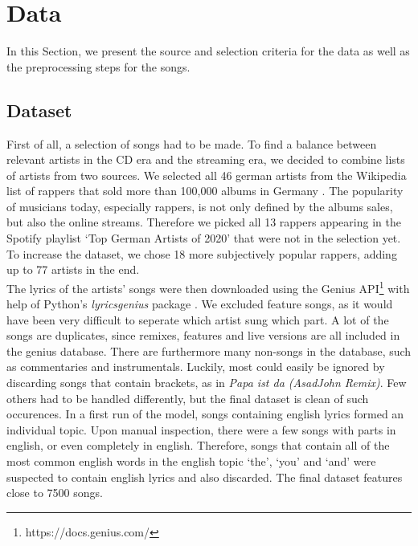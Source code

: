 \documentclass[conference]{IEEEtran}
\begin{document}
\section{Data}
In this Section, we present the source and selection criteria for the data as well as the preprocessing steps for the songs.

\subsection{Dataset}
First of all, a selection of songs had to be made. To find a balance between relevant artists in the CD era and the streaming era, we decided to combine lists of artists from two sources. We selected all 46 german artists from the Wikipedia list of rappers that sold more than 100,000 albums in Germany \cite{wiki_albums}. The popularity of musicians today, especially rappers, is not only defined by the albums sales, but also the online streams. Therefore we picked all 13 rappers appearing in the Spotify playlist {\lq}Top German Artists of 2020{\rq} \cite{spotify_2020} that were not in the selection yet. To increase the dataset, we chose 18 more subjectively popular rappers, adding up to 77 artists in the end.\\
The lyrics of the artists' songs were then downloaded using the Genius API\footnote{https://docs.genius.com/} with help of Python's \textit{lyricsgenius} package \cite{lyricsgenius}. We excluded feature songs, as it would have been very difficult to seperate which artist sung which part. A lot of the songs are duplicates, since remixes, features and live versions are all included in the genius database. There are furthermore many non-songs in the database, such as commentaries and instrumentals. Luckily, most could easily be ignored by discarding songs that contain brackets, as in \textit{Papa ist da (AsadJohn Remix)}. Few others had to be handled differently, but the final dataset is clean of such occurences. In a first run of the model, songs containing english lyrics formed an individual topic. Upon manual inspection, there were a few songs with parts in english, or even completely in english. Therefore, songs that contain all of the most common english words in the english topic {\lq}the{\rq}, {\lq}you{\rq} and {\lq}and{\rq} were suspected to contain english lyrics and also discarded. The final dataset features close to 7500 songs.
\end{document}
